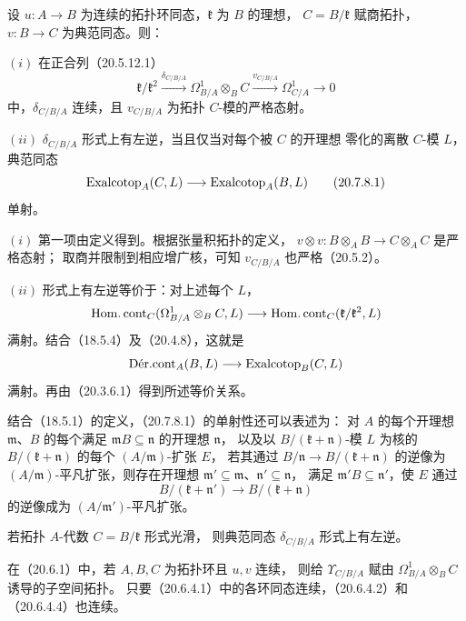 设 $u:A\to B$ 为连续的拓扑环同态，$\mathfrak k$ 为 $B$ 的理想，
$C=B/\mathfrak k$ 赋商拓扑，$v:B\to C$ 为典范同态。则：

$(i)$ 在正合列（20.5.12.1）
\[
 \mathfrak k/\mathfrak k^2\xrightarrow{\delta_{C/B/A}}
 \Omega^1_{B/A}\otimes_B C\xrightarrow{v_{C/B/A}}
 \Omega^1_{C/A}\longrightarrow0
\]
中，$\delta_{C/B/A}$ 连续，且 $v_{C/B/A}$ 为拓扑 $C$-模的严格态射。

$(ii)$ $\delta_{C/B/A}$ 形式上有左逆，当且仅当对每个被 $C$ 的开理想
零化的离散 $C$-模 $L$，典范同态
\begin{equation}
 \Exalcotop_A(C,L)\longrightarrow\Exalcotop_A(B,L)
 \tag{20.7.8.1}
\end{equation}
单射。

$(i)$ 第一项由定义得到。根据张量积拓扑的定义，
$v\otimes v:B\otimes_A B\to C\otimes_A C$ 是严格态射；
取商并限制到相应增广核，可知 $v_{C/B/A}$ 也严格（20.5.2）。

$(ii)$ 形式上有左逆等价于：对上述每个 $L$，
\[
 \HomCont_C(\Omega^1_{B/A}\otimes_B C,L)
 \longrightarrow\HomCont_C(\mathfrak k/\mathfrak k^2,L)
\]
满射。结合（18.5.4）及（20.4.8），这就是
\[
 \DerCont_A(B,L)\longrightarrow\Exalcotop_B(C,L)
\]
满射。再由（20.3.6.1）得到所述等价关系。

结合（18.5.1）的定义，（20.7.8.1）的单射性还可以表述为：
对 $A$ 的每个开理想 $\mathfrak m$、$B$ 的每个满足
$\mathfrak mB\subseteq\mathfrak n$ 的开理想 $\mathfrak n$，
以及以 $B/(\mathfrak k+\mathfrak n)$-模 $L$ 为核的
$B/(\mathfrak k+\mathfrak n)$ 的每个 $(A/\mathfrak m)$-扩张 $E$，
若其通过 $B/\mathfrak n\to B/(\mathfrak k+\mathfrak n)$ 的逆像为
$(A/\mathfrak m)$-平凡扩张，则存在开理想
$\mathfrak m'\subseteq\mathfrak m$、$\mathfrak n'\subseteq\mathfrak n$，
满足 $\mathfrak m'B\subseteq\mathfrak n'$，使 $E$ 通过
\[
 B/(\mathfrak k+\mathfrak n')\longrightarrow
 B/(\mathfrak k+\mathfrak n)
\]
的逆像成为 $(A/\mathfrak m')$-平凡扩张。

若拓扑 $A$-代数 $C=B/\mathfrak k$ 形式光滑，
则典范同态 $\delta_{C/B/A}$ 形式上有左逆。

在（20.6.1）中，若 $A,B,C$ 为拓扑环且 $u,v$ 连续，
则给 $\Upsilon_{C/B/A}$ 赋由 $\Omega^1_{B/A}\otimes_B C$ 诱导的子空间拓扑。
只要（20.6.4.1）中的各环同态连续，（20.6.4.2）和（20.6.4.4）也连续。

